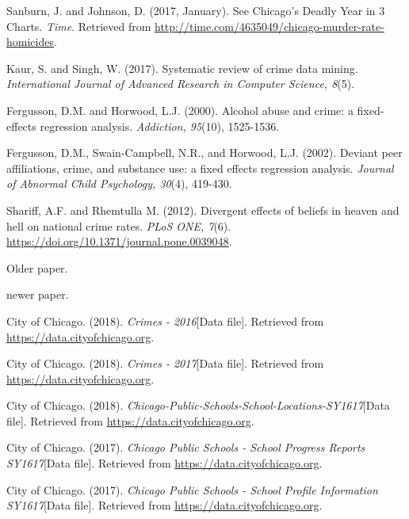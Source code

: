 \documentclass[12pt]{article}
\begin{document}
	\newpage
	\begin{thebibliography}{10}
	
Sanburn, J. and Johnson, D. (2017, January). See Chicago's Deadly Year in 3 Charts. \textit{Time}. Retrieved from \href{http://time.com/4635049/chicago-murder-rate-homicides}{http://time.com/4635049/chicago-murder-rate-homicides}.

Kaur, S. and Singh, W. (2017). Systematic review of crime data mining. \textit{International Journal of Advanced Research in Computer Science, 8}(5).

Fergusson, D.M. and Horwood, L.J. (2000). Alcohol abuse and crime: a fixed-effects regression analysis. \textit{Addiction, 95}(10), 1525-1536.

Fergusson, D.M., Swain-Campbell, N.R., and Horwood, L.J. (2002). Deviant peer affiliations, crime, and substance use: a fixed effects regression analysis. \textit{Journal of Abnormal Child Psychology, 30}(4), 419-430.

Shariff, A.F. and Rhemtulla M. (2012). Divergent effects of beliefs in heaven and hell on national crime rates. \textit{PLoS ONE, 7}(6). \href{https://doi.org/10.1371/journal.pone.0039048}{https://doi.org/10.1371/journal.pone.0039048}.

Older paper.

newer paper.

City of Chicago. (2018). \textit{Crimes - 2016}[Data file]. Retrieved from \href{https://data.cityofchicago.org}{https://data.cityofchicago.org}.

City of Chicago. (2018). \textit{Crimes - 2017}[Data file]. Retrieved from \href{https://data.cityofchicago.org}{https://data.cityofchicago.org}.

City of Chicago. (2018). \textit{Chicago-Public-Schools-School-Locations-SY1617}[Data file]. Retrieved from \href{https://data.cityofchicago.org}{https://data.cityofchicago.org}.

City of Chicago. (2017). \textit{Chicago Public Schools - School Progress Reports SY1617}[Data file]. Retrieved from \href{https://data.cityofchicago.org}{https://data.cityofchicago.org}.

City of Chicago. (2017). \textit{Chicago Public Schools - School Profile Information SY1617}[Data file]. Retrieved from \href{https://data.cityofchicago.org}{https://data.cityofchicago.org}.

	\end{thebibliography}
\end{document}
